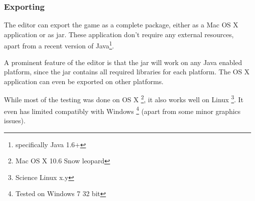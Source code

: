 \clearpage
\subsubsection{Exporting}
\label{ssub:exporting}

The editor can export the game as a complete package, either as a Mac OS X application or as jar. These application don't require any external resources, apart from a recent version of Java\footnote{specifically Java 1.6+}.

A prominent feature of the editor is that the jar will work on any Java enabled platform, since the jar contains all required libraries for each platform. The OS X application can even be exported on other platforms.

While most of the testing was done on OS X \footnote{Mac OS X 10.6 Snow leopard}, it also works well on Linux \footnote{Science  Linux x.y}. It even has limited compatibly with Windows \footnote{Tested on Windows 7 32 bit} (apart from some minor graphics issues).
